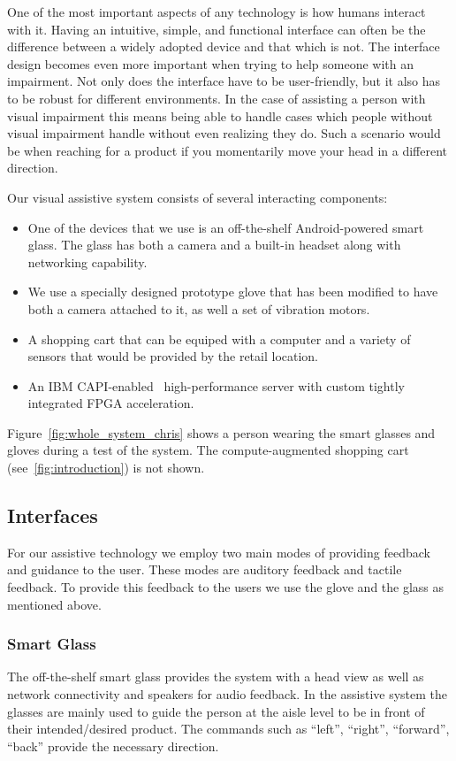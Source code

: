One of the most important aspects of any technology is how humans interact with it.
Having an intuitive, simple, and functional interface can often be the difference between
a widely adopted device and that which is not. The interface design becomes even more important
when trying to help someone with an impairment. Not only does the interface have to be user-friendly, 
but it also has to be robust for different environments. 
In the case of assisting a person with visual impairment this means being able to handle cases
which people without visual impairment handle without even realizing they do. 
Such a scenario would be when reaching for a product if you momentarily move your head in a different direction.

Our visual assistive system consists of several interacting components: 

\begin{itemize}
\item One of the devices that we use is an off-the-shelf Android-powered smart glass. 
The glass has both a camera and a built-in headset along with
networking capability. 
\item We use a specially designed prototype glove that has been
modified to have both a camera attached to it, as well a set of
vibration motors. 
\item A shopping cart that can be equiped with a computer
and a variety of sensors that would be provided by the retail location.
\item An IBM CAPI-enabled~\cite{CAPI} high-performance server with custom tightly integrated FPGA 
acceleration.
\end{itemize}

Figure~\ref{fig:whole_system_chris} shows a person wearing the smart
glasses and gloves during a test of the system. The compute-augmented
shopping cart (see~\ref{fig:introduction}) is not shown.


\subsection{Interfaces}
For our assistive technology we employ two main modes of providing feedback and guidance to the user. These modes are auditory feedback and tactile feedback. 
To provide this feedback to the users we use the glove and the glass as mentioned above.
\subsubsection{Smart Glass}
The off-the-shelf smart glass provides the system with a head view as well as 
network connectivity and speakers for audio feedback.
In the assistive system the glasses are mainly used to guide the person at the aisle level
to be in front of their intended/desired product. The commands such as ``left'', ``right'', ``forward'', ``back''
provide the necessary direction. 
